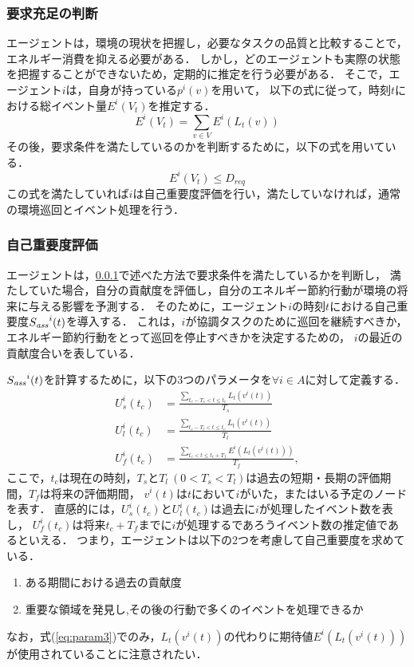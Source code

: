 \documentclass[12pt,a4j,twoside]{jarticle}
\def\AgentSet{A}
\def\SelfAss{{S_{\it ass}}}
\begin{document}
  \subsubsection{要求充足の判断}\label{subsec:judge}
  エージェントは，環境の現状を把握し，必要なタスクの品質と比較することで，エネルギー消費を抑える必要がある．
  しかし，どのエージェントも実際の状態を把握することができないため，定期的に推定を行う必要がある．
  そこで，エージェント$i$は，自身が持っている$p^i(v)$を用いて，
  以下の式に従って，時刻$t$における総イベント量$E^i(V_t)$を推定する．
  \begin{equation}\label{eq:fulfill}
    E^i(V_t) = \sum_{v \in V} E^i(L_t(v))
  \end{equation}
  その後，要求条件を満たしているのかを判断するために，以下の式を用いている．
  \begin{equation}\label{eq:requirement}
    E^i(V_t) \leq D_{req}
  \end{equation}
  この式を満たしていれば$i$は自己重要度評価を行い，満たしていなければ，通常の環境巡回とイベント処理を行う．

  \subsubsection{自己重要度評価}
  エージェントは，\ref{subsec:judge}で述べた方法で要求条件を満たしているかを判断し，
  満たしていた場合，自分の貢献度を評価し，自分のエネルギー節約行動が環境の将来に与える影響を予測する．
  そのために，エージェント$i$の時刻$t$における自己重要度$\SelfAss^i(t)$を導入する．
  これは，$i$が協調タスクのために巡回を継続すべきか，エネルギー節約行動をとって巡回を停止すべきかを決定するための，
  $i$の最近の貢献度合いを表している．
  \par

  $\SelfAss^i(t)$を計算するために，以下の3つのパラメータを$\forall i\in\AgentSet$に対して定義する．
  \begin{align}\label{eq:param1}
    U^i_s(t_c) &= \frac{\sum_{t_c-T_s < t \leq t_c} L_t(v^i(t))}{T_s}\\
    U^i_l(t_c) &= \frac{\sum_{t_c-T_l < t \leq t_c} L_t(v^i(t))}{T_l}\label{eq:param2}\\
    U^i_f(t_c) &= \frac{\sum_{t_c < t \leq t_c+T_f} E^i(L_t(v^i(t)))}{T_f},\label{eq:param3}
  \end{align}
  ここで，$t_c$は現在の時刻，$T_s$と$T_l~(0 < T_s < T_l)$は過去の短期・長期の評価期間，$T_f$は将来の評価期間，
  $v^i(t)$は$t$において$i$がいた，またはいる予定のノードを表す．
  直感的には，$U^i_s(t_c)$と$U^i_l(t_c)$は過去に$i$が処理したイベント数を表し，
  $U^i_f(t_c)$は将来$t_c+T_f$までに$i$が処理するであろうイベント数の推定値であるといえる．
  つまり，エージェントは以下の2つを考慮して自己重要度を求めている．
  \begin{enumerate}
    \item[(1)] ある期間における過去の貢献度
    \item[(2)] 重要な領域を発見し,その後の行動で多くのイベントを処理できるか
  \end{enumerate}
  なお，式(\ref{eq:param3})でのみ，$L_t(v^i(t))$の代わりに期待値$E^i(L_t(v^i(t)))$が使用されていることに注意されたい．
  \par
\end{document}
